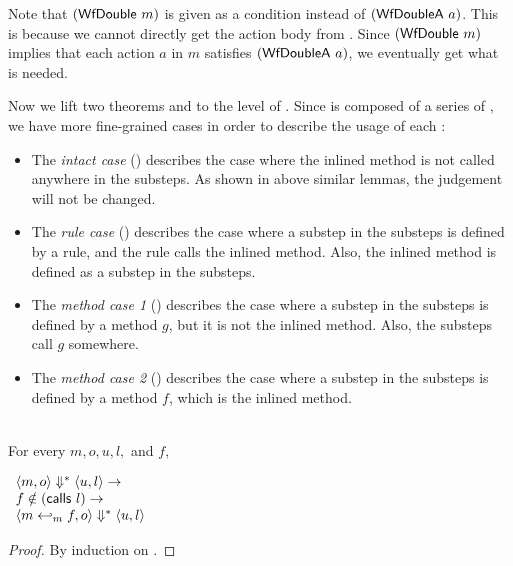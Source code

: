 Note that $(\textsf{WfDouble}\ m)$ is given as a condition instead of
$(\textsf{WfDoubleA}\ a)$. This is because we cannot directly get the action
body from \Substep{}. Since $(\textsf{WfDouble}\ m)$ implies that each action
$a$ in $m$ satisfies $(\textsf{WfDoubleA}\ a)$, we eventually get what is
needed.

Now we lift two theorems  and
 to the level of \Substeps{}. Since
\Substeps{} is composed of a series of \Substep{}, we have more
fine-grained cases in order to describe the usage of each \Substep{}:
\begin{itemize}
\item The \emph{intact case} () describes
  the case where the inlined method is not called anywhere in the
  substeps. As shown in above similar lemmas, the judgement will not
  be changed.
\item The \emph{rule case} () describes the
  case where a substep in the substeps is defined by a rule, and the
  rule calls the inlined method. Also, the inlined method is defined
  as a substep in the substeps.
\item The \emph{method case 1} ()
  describes the case where a substep in the substeps is defined by a
  method $g$, but it is not the inlined method. Also, the substeps
  call $g$ somewhere.
\item The \emph{method case 2} ()
  describes the case where a substep in the substeps is defined by a
  method $f$, which is the inlined method.
\end{itemize}


\begin{lemma}
  \label{lem-inlinedmm-intact}
  \mbox{}\\
  For every $m, o, u, l,$ and $f,$
  \begin{center}
    \begin{math}
      \begin{array}{l}
        \langle m, o \rangle \Downarrow^{\ast} \langle u, l \rangle \to \\
        f \notin (\textsf{calls}\ l) \to \\
        \langle m \hookleftarrow_{m}{} f, o \rangle \Downarrow^{\ast} \langle u, l \rangle
      \end{array}
    \end{math}
  \end{center}
\end{lemma}
\begin{proof}
  By induction on \Substeps{}.
\end{proof}

